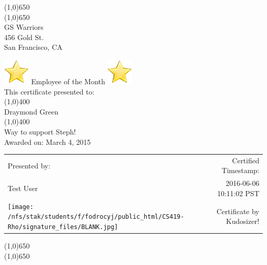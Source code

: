 \documentclass[landscape]{article} %
\begin{document}
	
	
		\begin{center}
		
			\line(1,0){650} \\
			\line(1,0){650} \\
			
			\vspace{0.1in}
			\huge{ GS Warriors } \\
			\Large{ 456 Gold St. } \\
			\Large{ San Francisco, CA } \\
			\vspace{0.1in}
			
			{\fontsize{36pt}{36pt}\selectfont
				\includegraphics[height=0.5in]{star.png}
				Employee of the Month
				\includegraphics[height=0.5in]{star.png}\\
				\vspace{0.2in}
			}
			\Large{ This certificate presented to: } \\
			\line(1,0){400} \\
			\vspace{0.1in}
			{\fontsize{40pt}{40pt}\selectfont
				Draymond Green \\
			}
			\line(1,0){400} \\
			\vspace{0.1in}
			\Large{ Way to support Steph! } \\
			\vspace{0.2in}
			\huge{ Awarded on: March 4, 2015 } \\
			
			\vspace{0.3in}
			\Large{
				\begin{tabular}{p{2.25in}p{4in}r}
					Presented by: &  & Certified Timestamp: \\
					Test User &  & 2016-06-06 10:11:02 PST \\
					\texttt{[image: /nfs/stak/students/f/fodrocyj/public\_html/CS419-Rho/signature\_files/BLANK.jpg]} &  & Certificate by Kudosizer!
				\end{tabular}
			}
			\vspace{0.1in}
			
			\line(1,0){650} \\
			\line(1,0){650} \\
			
		\end{center}
\end{document}
